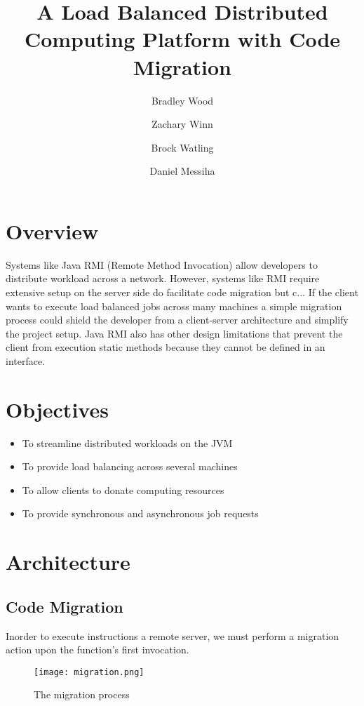 \documentclass[12pt, oneside,english]{article}
\title{A Load Balanced Distributed Computing Platform with Code Migration}
\author[1]{Bradley Wood}
\author[2]{Zachary Winn}
\author[3]{Brock Watling}
\author[4]{Daniel Messiha}
\affil[ ]{University of Ontario Institute of Technology}
\date{}
\begin{document}
    \maketitle

    \section{Overview}\label{sec:overview}

    Systems like Java RMI (Remote Method Invocation) allow developers to distribute
    workload across a network.
    However, systems like RMI require extensive setup on the server side do facilitate
    code migration but c...
    If the client wants to execute load balanced jobs across many machines
    a simple migration process could shield the developer from a client-server
    architecture and simplify the project setup.
    Java RMI also has other design limitations that prevent the client from execution static
    methods because they cannot be defined in an interface.

    \section{Objectives}\label{sec:objectives}

    \begin{itemize}
        \item To streamline distributed workloads on the JVM
        \item To provide load balancing across several machines
        \item To allow clients to donate computing resources
        \item To provide synchronous and asynchronous job requests
    \end{itemize}

    \section{Architecture}\label{sec:architecture}

    \subsection{Code Migration}\label{subsec:migration}

    Inorder to execute instructions a remote server, we must perform a migration action
    upon the function's first invocation.

    \begin{figure}[H]
        \centering
        \texttt{[image: migration.png]}
        \caption{The migration process}
    \end{figure}
\end{document}
